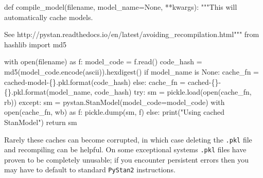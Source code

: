 \documentclass[
  letterpaper,
  DIV=11,
  numbers=noendperiod]{scrartcl}
\newenvironment{Shaded}{\begin{snugshade}}{\end{snugshade}}
\newcommand{\BuiltInTok}[1]{\textcolor[rgb]{0.00,0.23,0.31}{#1}}
\newcommand{\CommentTok}[1]{\textcolor[rgb]{0.37,0.37,0.37}{#1}}
\newcommand{\ControlFlowTok}[1]{\textcolor[rgb]{0.00,0.23,0.31}{#1}}
\newcommand{\ImportTok}[1]{\textcolor[rgb]{0.00,0.46,0.62}{#1}}
\newcommand{\KeywordTok}[1]{\textcolor[rgb]{0.00,0.23,0.31}{#1}}
\newcommand{\NormalTok}[1]{\textcolor[rgb]{0.00,0.23,0.31}{#1}}
\newcommand{\OperatorTok}[1]{\textcolor[rgb]{0.37,0.37,0.37}{#1}}
\newcommand{\SpecialCharTok}[1]{\textcolor[rgb]{0.37,0.37,0.37}{#1}}
\newcommand{\StringTok}[1]{\textcolor[rgb]{0.13,0.47,0.30}{#1}}
\newcommand{\VariableTok}[1]{\textcolor[rgb]{0.07,0.07,0.07}{#1}}
\begin{document}
\begin{Shaded}
\begin{Highlighting}[]
\KeywordTok{def}\NormalTok{ compile\_model(filename, model\_name}\OperatorTok{=}\VariableTok{None}\NormalTok{, }\OperatorTok{**}\NormalTok{kwargs):}
  \CommentTok{"""This will automatically cache models.}

\CommentTok{    See http://pystan.readthedocs.io/en/latest/avoiding\_recompilation.html"""}
  \ImportTok{from}\NormalTok{ hashlib }\ImportTok{import}\NormalTok{ md5}
  
  \ControlFlowTok{with} \BuiltInTok{open}\NormalTok{(filename) }\ImportTok{as}\NormalTok{ f:}
\NormalTok{    model\_code }\OperatorTok{=}\NormalTok{ f.read()}
\NormalTok{    code\_hash }\OperatorTok{=}\NormalTok{ md5(model\_code.encode(}\StringTok{\textquotesingle{}ascii\textquotesingle{}}\NormalTok{)).hexdigest()}
    \ControlFlowTok{if}\NormalTok{ model\_name }\KeywordTok{is} \VariableTok{None}\NormalTok{:}
\NormalTok{      cache\_fn }\OperatorTok{=} \StringTok{\textquotesingle{}cached{-}model{-}}\SpecialCharTok{\{\}}\StringTok{.pkl\textquotesingle{}}\NormalTok{.}\BuiltInTok{format}\NormalTok{(code\_hash)}
    \ControlFlowTok{else}\NormalTok{:}
\NormalTok{      cache\_fn }\OperatorTok{=} \StringTok{\textquotesingle{}cached{-}}\SpecialCharTok{\{\}}\StringTok{{-}}\SpecialCharTok{\{\}}\StringTok{.pkl\textquotesingle{}}\NormalTok{.}\BuiltInTok{format}\NormalTok{(model\_name, code\_hash) }
    \ControlFlowTok{try}\NormalTok{:}
\NormalTok{      sm }\OperatorTok{=}\NormalTok{ pickle.load(}\BuiltInTok{open}\NormalTok{(cache\_fn, }\StringTok{\textquotesingle{}rb\textquotesingle{}}\NormalTok{))}
    \ControlFlowTok{except}\NormalTok{:}
\NormalTok{      sm }\OperatorTok{=}\NormalTok{ pystan.StanModel(model\_code}\OperatorTok{=}\NormalTok{model\_code)}
      \ControlFlowTok{with} \BuiltInTok{open}\NormalTok{(cache\_fn, }\StringTok{\textquotesingle{}wb\textquotesingle{}}\NormalTok{) }\ImportTok{as}\NormalTok{ f:}
\NormalTok{        pickle.dump(sm, f)}
    \ControlFlowTok{else}\NormalTok{:}
       \BuiltInTok{print}\NormalTok{(}\StringTok{"Using cached StanModel"}\NormalTok{)}
    \ControlFlowTok{return}\NormalTok{ sm}
\end{Highlighting}
\end{Shaded}

Rarely these caches can become corrupted, in which case deleting the
\texttt{.pkl} file and recompiling can be helpful. On some exceptional
systems \texttt{.pkl} files have proven to be completely unusable; if
you encounter persistent errors then you may have to default to standard
\texttt{PyStan2} instructions.
\end{document}
